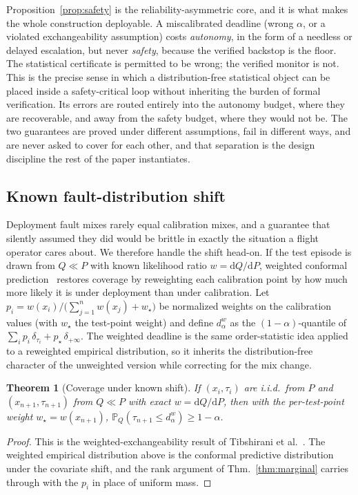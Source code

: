 \documentclass[11pt]{article}
\theoremstyle{plain}
\newtheorem{theorem}{Theorem}
\theoremstyle{definition}
\newcommand{\Prob}{\mathbb{P}}
\newcommand{\dalpha}{d_{\alpha}}
\begin{document}
Proposition~\ref{prop:safety} is the reliability-asymmetric core, and it is what makes the
whole construction deployable. A miscalibrated deadline
(wrong $\alpha$, or a violated exchangeability assumption) costs \emph{autonomy}, in the form
of a needless or delayed escalation, but never \emph{safety}, because the verified backstop
is the floor. The statistical certificate is permitted to be wrong; the verified monitor is
not. This is the precise sense in which a distribution-free statistical object can be placed
inside a safety-critical loop without inheriting the burden of formal verification. Its
errors are routed entirely into the autonomy budget, where they are recoverable, and away
from the safety budget, where they would not be. The two guarantees are proved under
different assumptions, fail in different ways, and are never asked to cover for each other,
and that separation is the design discipline the rest of the paper instantiates.

\subsection{Known fault-distribution shift} Deployment fault mixes rarely equal calibration
mixes, and a guarantee that silently assumed they did would be brittle in exactly the
situation a flight operator cares about. We therefore handle the shift head-on. If the test
episode is drawn from $Q\ll P$ with known likelihood ratio
$w=\mathrm{d}Q/\mathrm{d}P$, weighted conformal prediction~\cite{Tibshirani2019} restores
coverage by reweighting each calibration point by how much more likely it is under
deployment than under calibration. Let $p_i = w(x_i)/\big(\sum_{j=1}^n w(x_j)+w_{\star}\big)$
be normalized weights on
the calibration values (with $w_\star$ the test-point weight) and define $\dalpha^{w}$ as the
$(1-\alpha)$-quantile of $\sum_i p_i\,\delta_{\tau_i} + p_\star\,\delta_{+\infty}$. The
weighted deadline is the same order-statistic idea applied to a reweighted empirical
distribution, so it inherits the distribution-free character of the unweighted version while
correcting for the mix change.

\begin{theorem}[Coverage under known shift]
\label{thm:weighted}
If $(x_i,\tau_i)$ are i.i.d.\ from $P$ and $(x_{n+1},\tau_{n+1})$ from $Q\ll P$ with exact
$w=\mathrm{d}Q/\mathrm{d}P$, then with the per-test-point weight $w_\star=w(x_{n+1})$,
$\Prob_{Q}(\tau_{n+1}\le \dalpha^{w}) \ge 1-\alpha$.
\end{theorem}
\begin{proof}
This is the weighted-exchangeability result of Tibshirani et al.~\cite{Tibshirani2019}. The
weighted empirical distribution above is the conformal predictive distribution under the
covariate shift, and the rank argument of Thm.~\ref{thm:marginal} carries through with the
$p_i$ in place of uniform mass.
\end{proof}
\end{document}
